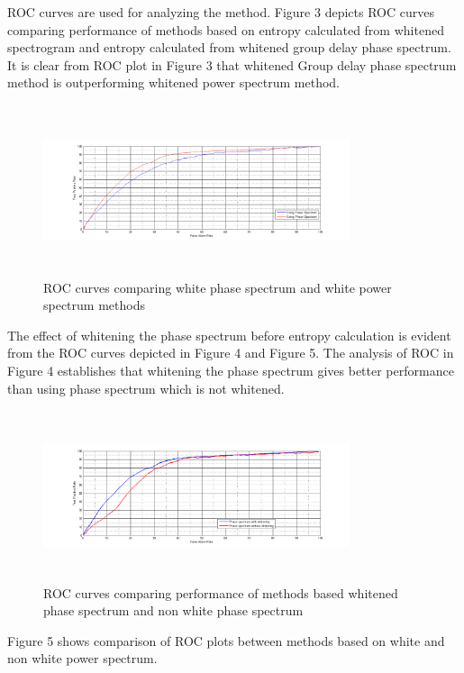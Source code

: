 \documentclass[a4paper]{article}
\begin{document}
 ROC curves are used for analyzing the method. Figure 3 depicts ROC curves comparing performance of methods based on entropy calculated from whitened spectrogram and entropy calculated from whitened group delay phase spectrum. It is clear from ROC plot in Figure 3 that whitened Group delay phase spectrum method is outperforming whitened power spectrum method.


\begin{figure}[!ht]
	\centering
	\includegraphics[width=9cm, height=5cm]{Power_vs_phase_white}
	\caption{ROC curves comparing white phase spectrum and white power spectrum methods}   
\end{figure} 



The effect of whitening the phase spectrum before entropy calculation is evident from the ROC curves depicted in Figure 4 and Figure 5. The analysis of ROC in Figure 4 establishes that whitening the phase spectrum gives better performance than using phase spectrum which is not whitened. 

\begin{figure}[!ht]
	\centering
	\includegraphics[width=9cm, height=5cm]{phase_non_white_vs_phase_white}
	\caption{ROC curves comparing performance of methods based whitened phase spectrum and non white phase spectrum}   
\end{figure} 
 
 Figure 5 shows comparison of ROC plots between methods based on white and non white power spectrum. 
 
\end{document}
